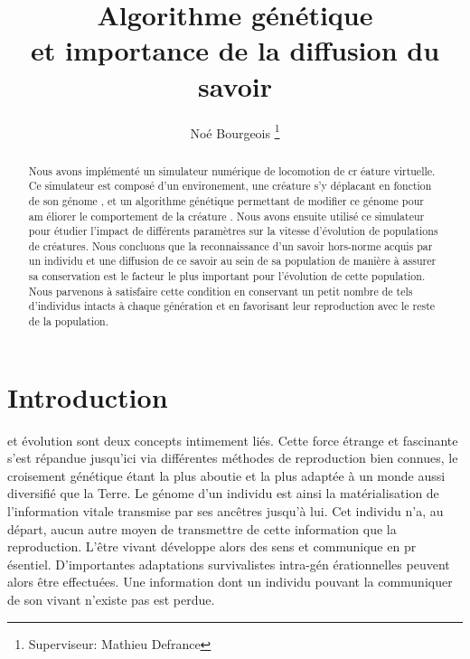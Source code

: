 \documentclass[journal, a4paper]{IEEEtran}
\begin{document}
	\title{Algorithme génétique \\ et importance de la diffusion du
	savoir}
	\author{Noé Bourgeois
	\thanks{Superviseur: Mathieu Defrance}}
	\maketitle

\begin{abstract}
	Nous avons implémenté un simulateur numérique de locomotion de cr
	éature virtuelle. Ce simulateur est
	composé d'un environement, une créature s'y déplacant en fonction
	de son génome
	, et
	un
	algorithme génétique permettant de modifier ce génome pour am
	éliorer le comportement de la créature
	.
	Nous avons ensuite utilisé ce simulateur pour étudier l'impact de
	différents paramètres sur la vitesse d'évolution de populations
	de créatures.
	Nous concluons que la reconnaissance d'un savoir hors-norme acquis
	par
	un individu et une diffusion de ce savoir au sein de sa population
	de manière à assurer sa conservation
	est
	le facteur le plus
	important
	pour l'évolution de cette population.
	Nous parvenons à satisfaire cette condition en conservant un petit
	nombre de tels d'individus intacts à chaque génération et en
	favorisant leur reproduction avec le reste de la population.
\end{abstract}

\section{Introduction}
	 et évolution sont deux concepts intimement liés.
	Cette force étrange et fascinante s'est répandue jusqu'ici via
	différentes méthodes de reproduction bien connues, le croisement
	génétique étant la plus aboutie et la plus adaptée à un monde aussi
	diversifié que la Terre.
	Le génome d'un individu est ainsi la matérialisation de
	l'information vitale transmise par ses ancêtres jusqu'à lui.
	Cet individu n'a, au départ, aucun autre moyen de transmettre de
	cette information que la reproduction.
	L'être vivant développe alors des sens et communique en pr
	ésentiel. D'importantes adaptations survivalistes intra-gén
	érationnelles  peuvent alors être effectuées. Une information
	dont un individu pouvant la communiquer de son vivant n'existe
	pas est perdue.
\end{document}
